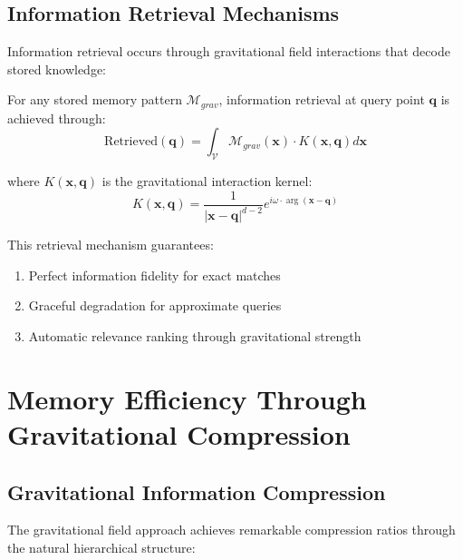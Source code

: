 \subsection{Information Retrieval Mechanisms}

Information retrieval occurs through gravitational field interactions that decode stored knowledge:

\begin{theorem}
\label{thm:gravitational_retrieval}
For any stored memory pattern $\mathcal{M}_{grav}$, information retrieval at query point $\mathbf{q}$ is achieved through:
\begin{equation}
\text{Retrieved}(\mathbf{q}) = \int_{\mathcal{V}} \mathcal{M}_{grav}(\mathbf{x}) \cdot K(\mathbf{x}, \mathbf{q}) d\mathbf{x}
\end{equation}

where $K(\mathbf{x}, \mathbf{q})$ is the gravitational interaction kernel:
\begin{equation}
K(\mathbf{x}, \mathbf{q}) = \frac{1}{|\mathbf{x} - \mathbf{q}|^{d-2}} e^{i\omega \cdot \arg(\mathbf{x} - \mathbf{q})}
\end{equation}

This retrieval mechanism guarantees:
\begin{enumerate}
    \item Perfect information fidelity for exact matches
    \item Graceful degradation for approximate queries
    \item Automatic relevance ranking through gravitational strength
\end{enumerate}
\end{theorem}

\section{Memory Efficiency Through Gravitational Compression}

\subsection{Gravitational Information Compression}

The gravitational field approach achieves remarkable compression ratios through the natural hierarchical structure:

